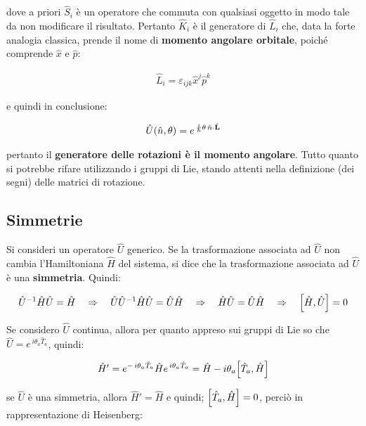 	dove a priori $\hat{S}_i$ è un operatore che commuta con qualsiasi oggetto in modo tale da non modificare il risultato. Pertanto $\hat{K}_i$ è il generatore di $\hat{L}_i$ che, data la forte analogia classica, prende il nome di \textbf{momento angolare orbitale}, poiché comprende $\hat{x}$ e $\hat{p}$:
	
\begin{align*}
	\hat{L}_i = \varepsilon_{ijk} \hat{x}^j \hat{p}^k
\end{align*}

	e quindi in conclusione:
	
\begin{align*}
	\hat{U}\qty(\hat{n}, \theta) = e^{\, \frac{i}{\hbar} \theta \, \hat{n} \cdot \hat{\vb{L}}}
\end{align*}

	pertanto il \textbf{generatore delle rotazioni è il momento angolare}. Tutto quanto si potrebbe rifare utilizzando i gruppi di Lie, stando attenti nella definizione (dei segni) delle matrici di rotazione.

\subsection{Simmetrie}

	Si consideri un operatore $\hat{U}$ generico. Se la trasformazione associata ad $\hat{U}$ non cambia l'Hamiltoniana $\hat{H}$ del sistema, si dice che la trasformazione associata ad $\hat{U}$ è una \textbf{simmetria}. Quindi:
	
\begin{align*}
	\hat{U}^{-1} \hat{H} \hat{U} = \hat{H} \quad \Rightarrow \quad \hat{U} \hat{U}^{-1} \hat{H} \hat{U} = \hat{U} \hat{H} \quad \Rightarrow \quad \hat{H} \hat{U} = \hat{U} \hat{H} \quad \Rightarrow \quad \qty[\hat{H}, \hat{U}] = 0
\end{align*}

	Se considero $\hat{U}$ continua, allora per quanto appreso sui gruppi di Lie so che $\hat{U} = e^{\, i \theta_a \hat{T}_a}$, quindi:
	
\begin{align*}
	\hat{H}' = e^{ - \, i \theta_a \hat{T}_a} \hat{H} e^{ \, i \theta_a \hat{T}_a} = \hat{H} - i \theta_a \qty[\hat{T}_a, \hat{H}]
\end{align*}

	se $\hat{U}$ è una simmetria, allora $\hat{H}' = \hat{H}$ e quindi; $\qty[\hat{T}_a, \hat{H}] = 0$, perciò in rappresentazione di Heisenberg:
	
